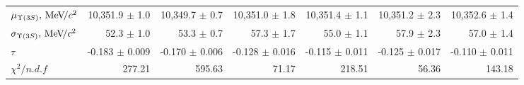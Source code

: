 \begin{table}[H]
{{\begin{tabular}{lrrrrrr}
\rule{0pt}{4ex}$\mu_{\Y3S}, \mevcc$ & 10,351.9 $\pm$ 1.0 & 10,349.7 $\pm$ 0.7 & 10,351.0 $\pm$ 1.8 & 10,351.4 $\pm$ 1.1 & 10,351.2 $\pm$ 2.3 & 10,352.6 $\pm$ 1.4\\
$\sigma_{\Y3S}, \mevcc$ & 52.3 $\pm$ 1.0 & 53.3 $\pm$ 0.7 & 57.3 $\pm$ 1.7 & 55.0 $\pm$ 1.1 & 57.9 $\pm$ 2.3 & 57.0 $\pm$ 1.4\\

\rule{0pt}{4ex}$\tau$ & -0.183 $\pm$ 0.009 & -0.170 $\pm$ 0.006 & -0.128 $\pm$ 0.016 & -0.115 $\pm$ 0.011 & -0.125 $\pm$ 0.017 & -0.110 $\pm$ 0.011\\

\rule{0pt}{4ex}$\chi^2 / n.d.f$ & 277.21 & 595.63 & 71.17 & 218.51 & 56.36 & 143.18\\
\bottomrule
\end{tabular}
} %

} %
\label{tab:upsilon:result:fits}
\end{table}
